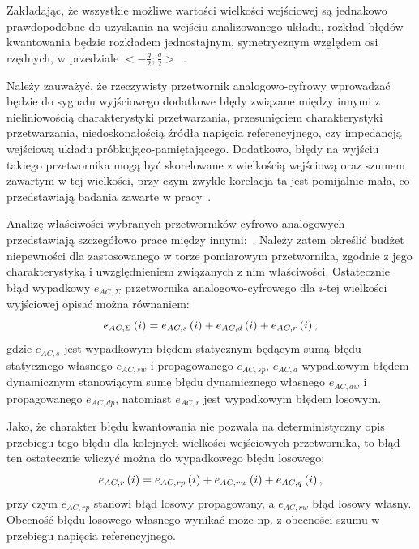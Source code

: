 Zakładając, że wszystkie możliwe wartości wielkości wejściowej są jednakowo prawdopodobne do uzyskania na wejściu analizowanego układu, rozkład błędów kwantowania będzie rozkładem jednostajnym, symetrycznym względem osi rzędnych, w przedziale $<-\frac{q}{2};\frac{q}{2}>$~\cite{jakubiec_system, sienkowski_kwant}.

Należy zauważyć, że rzeczywisty przetwornik analogowo-cyfrowy wprowadzać będzie do sygnału wyjściowego dodatkowe błędy związane między innymi z nieliniowością charakterystyki przetwarzania, przesunięciem charakterystyki przetwarzania, niedoskonałością źródła napięcia referencyjnego, czy impedancją wejściową układu próbkująco-pamiętającego. Dodatkowo, błędy na wyjściu takiego przetwornika mogą być skorelowane z wielkością wejściową oraz szumem zawartym w tej wielkości, przy czym zwykle korelacja ta jest pomijalnie mała, co przedstawiają badania zawarte w pracy~\cite{sienkowski_adc}.

Analizę właściwości wybranych przetworników cyfrowo-analogowych przedstawiają szczegółowo prace między innymi:~\cite{jakubiec_system, sienkowski_adc, sienkowski_kwant, arpaia_deltasigma}. Należy zatem określić budżet niepewności dla zastosowanego w torze pomiarowym przetwornika, zgodnie z jego charakterystyką i uwzględnieniem związanych z nim właściwości. Ostatecznie błąd wypadkowy $e_{AC,\Sigma}$ przetwornika analogowo-cyfrowego dla $i$-tej wielkości wyjściowej opisać można równaniem:
\begin{equation}
e_{AC,\Sigma} \left(i\right) = e_{AC,s} \left(i\right) + e_{AC,d} \left(i\right) + e_{AC,r} \left(i\right) \label{eq:adc_outerr},
\end{equation}
gdzie $e_{AC,s}$ jest wypadkowym błędem statycznym będącym sumą błędu statycznego własnego $e_{AC,sw}$ i propagowanego $e_{AC,sp}$, $e_{AC,d}$ wypadkowym błędem dynamicznym stanowiącym sumę błędu dynamicznego własnego $e_{AC,dw}$ i propagowanego $e_{AC,dp}$, natomiast $e_{AC,r}$ jest wypadkowym błędem losowym.

Jako, że charakter błędu kwantowania nie pozwala na deterministyczny opis przebiegu tego błędu dla kolejnych wielkości wejściowych przetwornika, to błąd ten ostatecznie wliczyć można do wypadkowego błędu losowego:
\begin{equation}
e_{AC,r} \left(i\right) = e_{AC,rp} \left(i\right) + e_{AC,rw} \left(i\right) + e_{AC,q} \left(i\right) \label{eq:adc_rerr},
\end{equation}
przy czym $e_{AC,rp}$ stanowi błąd losowy propagowany, a $e_{AC,rw}$ błąd losowy własny. Obecność błędu losowego własnego wynikać może np. z obecności szumu w przebiegu napięcia referencyjnego.

